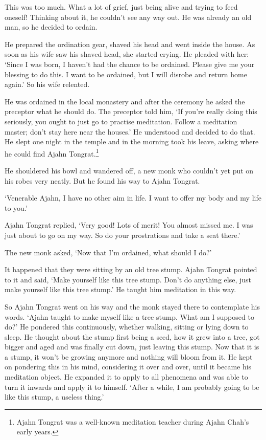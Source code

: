 This was too much. What a lot of grief, just being alive and trying to feed oneself! Thinking about it, he couldn't see any way out. He was already an old man, so he decided to ordain.

He prepared the ordination gear, shaved his head and went inside the house. As soon as his wife saw his shaved head, she started crying. He pleaded with her: `Since I was born, I haven't had the chance to be ordained. Please give me your blessing to do this. I want to be ordained, but I will disrobe and return home again.' So his wife relented.

He was ordained in the local monastery and after the ceremony he asked the preceptor what he should do. The preceptor told him, `If you're really doing this seriously, you ought to just go to practise meditation. Follow a meditation master; don't stay here near the houses.' He understood and decided to do that. He slept one night in the temple and in the morning took his leave, asking where he could find Ajahn Tongrat.\footnote{Ajahn Tongrat was a well-known meditation teacher during Ajahn Chah's early years.}

He shouldered his bowl and wandered off, a new monk who couldn't yet put on his robes very neatly. But he found his way to Ajahn Tongrat.

`Venerable Ajahn, I have no other aim in life. I want to offer my body and my life to you.'

Ajahn Tongrat replied, `Very good! Lots of merit! You almost missed me. I was just about to go on my way. So do your prostrations and take a seat there.'

The new monk asked, `Now that I'm ordained, what should I do?'

It happened that they were sitting by an old tree stump. Ajahn Tongrat pointed to it and said, `Make yourself like this tree stump. Don't do anything else, just make yourself like this tree stump.' He taught him meditation in this way.

So Ajahn Tongrat went on his way and the monk stayed there to contemplate his words. `Ajahn taught to make myself like a tree stump. What am I supposed to do?' He pondered this continuously, whether walking, sitting or lying down to sleep. He thought about the stump first being a seed, how it grew into a tree, got bigger and aged and was finally cut down, just leaving this stump. Now that it is a stump, it won't be growing anymore and nothing will bloom from it. He kept on pondering this in his mind, considering it over and over, until it became his meditation object. He expanded it to apply to all phenomena and was able to turn it inwards and apply it to himself. `After a while, I am probably going to be like this stump, a useless thing.'


